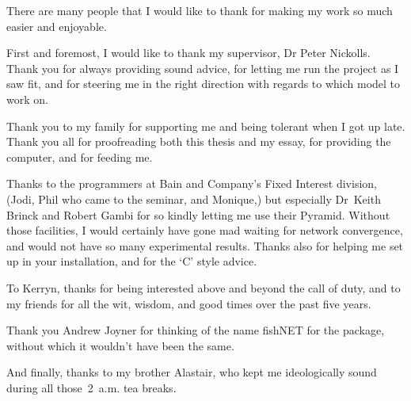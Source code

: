 There are many people that I would like to thank for making my work so
much easier and enjoyable.

First and foremost, I would like to thank my supervisor, Dr Peter Nickolls.
Thank you for always
providing sound advice, for letting me run the project
as I saw fit, and for steering me in the right direction with regards
to which model to work on.

Thank you to my family for supporting me and being tolerant when
I got up late.
Thank you all for proofreading both this thesis and my essay, 
for providing the computer, and for feeding me.

Thanks to the programmers at Bain and Company's Fixed Interest
division, (Jodi, Phil who came
to the seminar, and Monique,) but especially 
Dr~Keith Brinck and Robert Gambi for so kindly letting me use their
Pyramid.
Without those facilities, I would certainly have gone mad
waiting for network convergence, and would not have so many
experimental results.
Thanks also for helping me set up in your installation, and for the `C'
style advice.

To Kerryn, thanks for being interested above and beyond the call of
duty, and to my friends for all the wit, wisdom, and good times
over the past five years.

Thank you Andrew Joyner for thinking of the name fishNET for the package,
without which it wouldn't have been the same.

And finally, thanks to my brother Alastair, who kept me ideologically sound
during all those~2~a.m. tea breaks.

